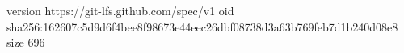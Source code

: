 version https://git-lfs.github.com/spec/v1
oid sha256:162607c5d9d6f4bee8f98673e44eec26dbf08738d3a63b769feb7d1b240d08e8
size 696
